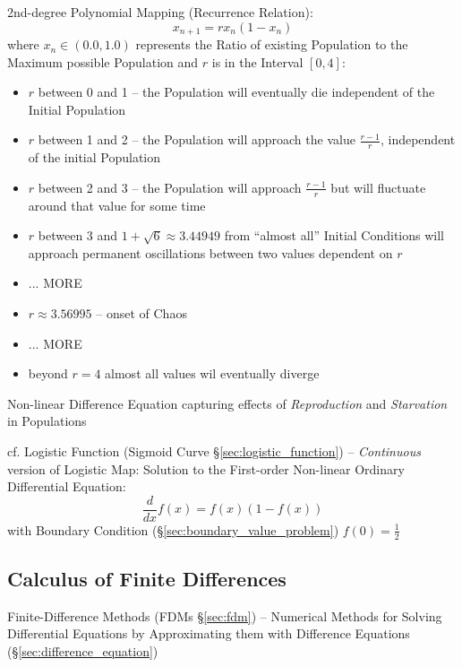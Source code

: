 2nd-degree Polynomial Mapping (Recurrence Relation):
\[
  x_{n+1} = rx_n(1-x_n)
\]
where $x_n \in (0.0, 1.0)$ represents the Ratio of existing Population to the
Maximum possible Population and $r$ is in the Interval $[0,4]$:
\begin{itemize}
  \item $r$ between 0 and 1 -- the Population will eventually die independent of
    the Initial Population
  \item $r$ between 1 and 2 -- the Population will approach the value
    $\frac{r-1}{r}$, independent of the initial Population
  \item $r$ between 2 and 3 -- the Population will approach $\frac{r-1}{r}$ but
    will fluctuate around that value for some time
  \item $r$ between 3 and $1 + \sqrt{6} \approx 3.44949$ from ``almost all''
    Initial Conditions will approach permanent oscillations between two values
    dependent on $r$
  \item ... MORE
  \item $r \approx 3.56995$ -- onset of Chaos
  \item ... MORE
  \item beyond $r=4$ almost all values wil eventually diverge
\end{itemize}

Non-linear Difference Equation capturing effects of \emph{Reproduction} and
\emph{Starvation} in Populations

\fist cf. Logistic Function (Sigmoid Curve \S\ref{sec:logistic_function}) --
\emph{Continuous} version of Logistic Map: Solution to the First-order
Non-linear Ordinary Differential Equation:
\[
  \frac{d}{dx}f(x) = f(x)(1 - f(x))
\]
with Boundary Condition (\S\ref{sec:boundary_value_problem}) $f(0) =
\frac{1}{2}$



\subsection{Calculus of Finite Differences}
\label{sec:finite_differences_calculus}

\fist Finite-Difference Methods (FDMs \S\ref{sec:fdm}) -- Numerical Methods for
Solving Differential Equations by Approximating them with Difference Equations
(\S\ref{sec:difference_equation})



